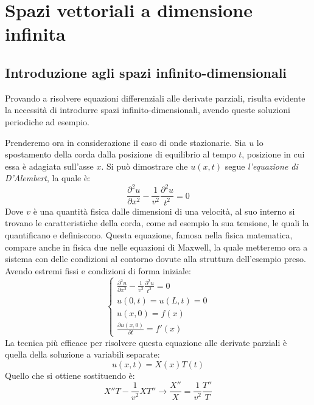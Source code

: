 \chapter{Spazi vettoriali a dimensione infinita}


\section{Introduzione agli spazi infinito-dimensionali}

Provando a risolvere equazioni differenziali alle derivate parziali, risulta evidente la necessità di introdurre spazi infinito-dimensionali, avendo queste soluzioni periodiche ad esempio.

Prenderemo ora in considerazione il caso di onde stazionarie. Sia $u$ lo spostamento della corda dalla posizione di equilibrio al tempo $t$, posizione in cui essa è adagiata sull'asse $x$. Si può dimostrare che $u(x,t)$ segue \textit{l'equazione di D'Alembert}, la quale è:
\begin{equation}
    \label{eq:Alembert}
    \frac{\partial^2 u}{\partial x^2} - \frac{1}{v^2} \frac{\partial^2 u}{t^2} = 0
\end{equation}
Dove $v$ è una quantità fisica dalle dimensioni di una velocità, al suo interno si trovano le caratteristiche della corda, come ad esempio la sua tensione, le quali la quantificano e definiscono. Questa equazione, famosa nella fisica matematica, compare anche in fisica due nelle equazioni di Maxwell, la quale metteremo ora a sistema con delle condizioni al contorno dovute alla struttura dell'esempio preso. Avendo estremi fissi e condizioni di forma iniziale:
\begin{equation*}
    \begin{cases}
        \frac{\partial^2 u}{\partial x^2} - \frac{1}{v^2} \frac{\partial^2 u}{t^2} = 0 \\
        u(0,t) = u(L,t) = 0 \\
        u(x,0) = f(x) \\
        \frac{\partial u(x,0)}{\partial t} = f'(x)
    \end{cases}
\end{equation*}
La tecnica più efficace per risolvere questa equazione alle derivate parziali è quella della soluzione a variabili separate:
\begin{equation*}
    u(x,t) = X(x)T(t)
\end{equation*}
Quello che si ottiene sostituendo è:
\begin{equation*}
    X''T-\frac{1}{v^2}XT'' \longrightarrow
    \frac{X''}{X} = \frac{1}{v^2} \frac{T''}{T}
\end{equation*}

